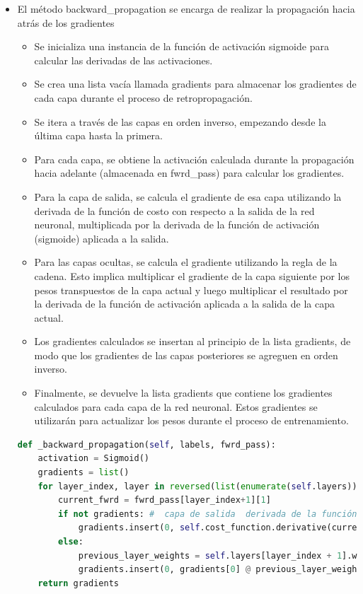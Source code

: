 \documentclass{article}
\begin{document}
\begin{itemize}
        \item El método backward\_propagation se encarga de realizar la propagación hacia atrás de los gradientes
        \begin{itemize}
            \item Se inicializa una instancia de la función de activación sigmoide para calcular las derivadas de las activaciones.
            \item Se crea una lista vacía llamada gradients para almacenar los gradientes de cada capa durante el proceso de retropropagación.
            \item Se itera a través de las capas en orden inverso, empezando desde la última capa hasta la primera.
            \item Para cada capa, se obtiene la activación calculada durante la propagación hacia adelante
            (almacenada en fwrd\_pass) para calcular los gradientes.
            \item Para la capa de salida, se calcula el gradiente de esa capa utilizando
            la derivada de la función de costo con respecto a la salida de la red neuronal,
            multiplicada por la derivada de la función de activación (sigmoide) aplicada a la salida.
            \item Para las capas ocultas, se calcula el gradiente utilizando la regla de la cadena.
            Esto implica multiplicar el gradiente de la capa siguiente por los pesos transpuestos de la capa actual
            y luego multiplicar el resultado por la derivada de la función de activación aplicada a la salida de la capa actual.
            \item Los gradientes calculados se insertan al principio de la lista gradients,
            de modo que los gradientes de las capas posteriores se agreguen en orden inverso.
            \item Finalmente, se devuelve la lista gradients que contiene los gradientes calculados
            para cada capa de la red neuronal.
            Estos gradientes se utilizarán para actualizar los pesos durante el proceso de entrenamiento.
        \end{itemize}

        \begin{lstlisting}[language=Python, caption={Propagación hacia atrás}, label={lst:backward_propagation}]
def _backward_propagation(self, labels, fwrd_pass):
    activation = Sigmoid()
    gradients = list()
    for layer_index, layer in reversed(list(enumerate(self.layers))): # Iteramos las capas de atrás hacia adelante
        current_fwrd = fwrd_pass[layer_index+1][1]
        if not gradients: #  capa de salida  derivada de la función de coste
            gradients.insert(0, self.cost_function.derivative(current_fwrd, labels) * activation.derivative(current_fwrd))
        else:
            previous_layer_weights = self.layers[layer_index + 1].weights.T
            gradients.insert(0, gradients[0] @ previous_layer_weights * activation.derivative(current_fwrd))
    return gradients
        \end{lstlisting}


\end{itemize}
\end{document}
